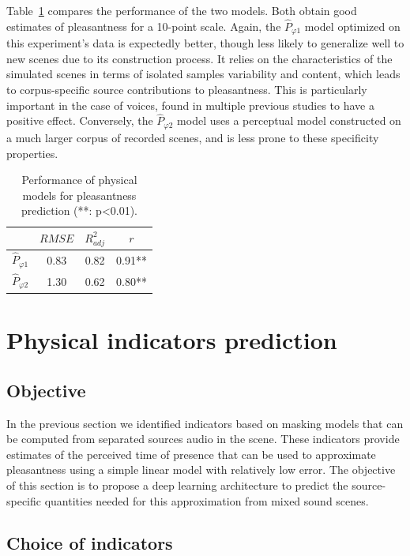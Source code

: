 \documentclass[11pt,a4paper]{article}
\begin{document}
Table~\ref{tab:physm} compares the performance of the two models. Both obtain good estimates of pleasantness for a 10-point scale. Again, the $\hat P_{\varphi 1}$ model optimized on this experiment's data is expectedly better, though less likely to generalize well to new scenes due to its construction process. It relies on the characteristics of the simulated scenes in terms of isolated samples variability and content, which leads to corpus-specific source contributions to pleasantness. This is particularly important in the case of voices, found in multiple previous studies to have a positive effect. Conversely, the $\hat P_{\varphi 2}$ model uses a perceptual model constructed on a much larger corpus of recorded scenes, and is less prone to these specificity properties.

\begin{table}[t]
\centering
\caption{Performance of physical models for pleasantness prediction (**: p<0.01).}
\label{tab:physm}
\begin{tabular}{ c | c | c | c }
\hline
	 & $RMSE$ & $R^2_{adj}$ & $r$ \\ \hline
	$\hat P_{\varphi 1}$ & 0.83 & 0.82 & 0.91** \\
	$\hat P_{\varphi 2}$ & 1.30 & 0.62 & 0.80** \\ \hline
\end{tabular}
\end{table}



\section{Physical indicators prediction}

\subsection{Objective}

In the previous section we identified indicators based on masking models that can be computed from separated sources audio in the scene. These indicators provide estimates of the perceived time of presence that can be used to approximate pleasantness using a simple linear model with relatively low error. The objective of this section is to propose a deep learning architecture to predict the source-specific quantities needed for this approximation from mixed sound scenes.

\subsection{Choice of indicators}
\end{document}
